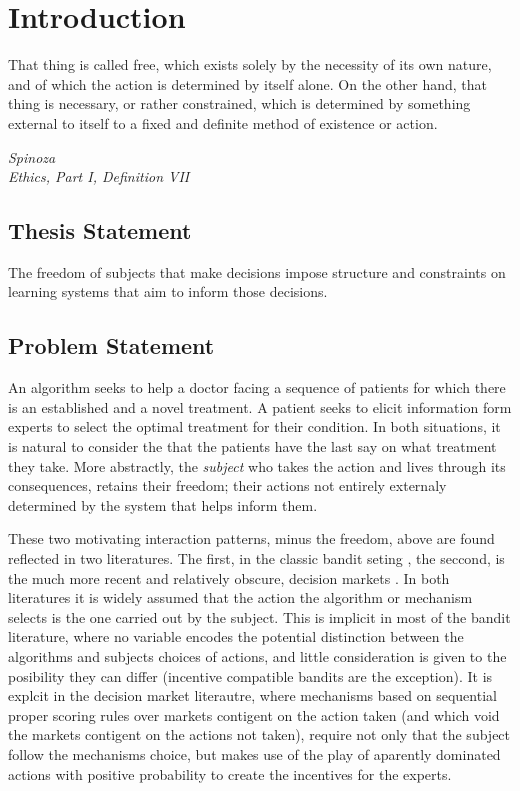 \chapter{Introduction}
\label{cha:intro}



\epigraph{
That thing is called free, which exists solely by the necessity of its own nature, and of which the action is determined by itself alone. On the other hand, that thing is necessary, or rather constrained, which is determined by something external to itself to a fixed and definite method of existence or action.}{\textit{Spinoza \\Ethics, Part I, Definition VII}}


\section{Thesis Statement}
\label{sec:thesisstatement}

The freedom of subjects that make decisions impose structure and constraints on learning systems that aim to inform those decisions. 

\section{Problem Statement}
\label{sec:problemstatement}


An algorithm seeks to help a doctor facing a sequence of patients for which there is an established and a novel treatment. A patient seeks to elicit information form experts to select the optimal treatment for their condition. In both situations, it is natural to consider the  that the patients have the last say on what treatment they take. More abstractly, the \emph{subject} who takes the action and lives through its consequences, retains their freedom; their actions not entirely externaly determined by the system that helps inform them.

These two motivating interaction patterns, minus the freedom, above are found reflected in two literatures. The first, in the classic bandit seting \cite{thompson:33,gittins1979bandit,bubeck:12}, the seccond, is the much more recent and relatively obscure, decision markets \cite{berg2003prediction,hanson2002decision,othman2010decision,boutilier2012eliciting,chen2014eliciting}. In both literatures it is widely assumed that the action the algorithm or mechanism selects is the one carried out by the subject. This is implicit in most of the bandit literature, where no variable encodes the potential distinction between the algorithms and subjects choices of actions, and little consideration is given to the posibility they can differ (incentive compatible bandits are the exception). It is explcit in the decision market literautre, where mechanisms based on sequential proper scoring rules over markets contigent on the action taken (and which void the markets contigent on the actions not taken), require not only that the subject follow the mechanisms choice, but makes use of the play of aparently dominated actions with positive probability to create the incentives for the experts. 

